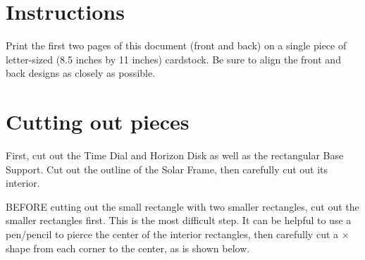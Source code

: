 \documentclass[tikz]{article}
\newif\ifPrintInstructions  %
\newcommand*{\OutlineWidth}{2pt}
\newcommand*{\SunCarriageWidth}{1.8cm}
\newcommand*{\SunCarriageHeight}{\SunCarriageWidth}
\newcommand*{\SunCarriageInternalWidth}{0.4cm}
\begin{document}
\ifPrintInstructions
	\newpage
	\begin{multicols}{2}
	\section*{Instructions}
	Print the first two pages of this document (front and back) on a single piece of letter-sized (8.5 inches by 11 inches) cardstock. Be sure to align the front and back designs as closely as possible. 
	
	\section{Cutting out pieces}
	First, cut out the Time Dial and Horizon Disk as well as the rectangular Base Support. Cut out the outline of the Solar Frame, then carefully cut out its interior. 
	
	BEFORE cutting out the small rectangle with two smaller rectangles, cut out the smaller rectangles first. This is the most difficult step. It can be helpful to use a pen/pencil to pierce the center of the interior rectangles, then carefully cut a $\times$ shape from each corner to the center, as is shown below.
	\begin{center}
\end{center}
\end{multicols}
\end{document}
